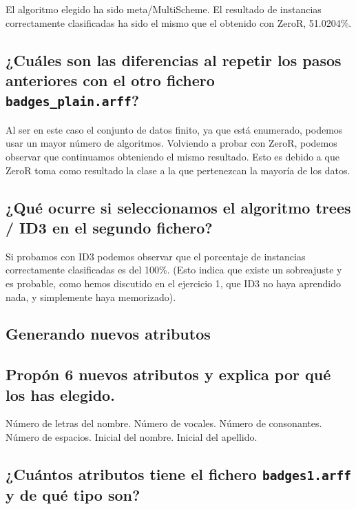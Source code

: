 \documentclass[12pt]{article}
\begin{document}
El algoritmo elegido ha sido meta/MultiScheme. El resultado de instancias correctamente clasificadas ha sido el mismo que el obtenido con ZeroR, 51.0204\%.

\subsection{\small ¿Cuáles son las diferencias al repetir los pasos anteriores con el otro
fichero \texttt{badges\_plain.arff}?}

Al ser en este caso el conjunto de datos finito, ya que está enumerado, podemos usar un mayor número de algoritmos. Volviendo a probar con ZeroR, podemos observar que continuamos obteniendo el mismo resultado. Esto es debido a que ZeroR toma como resultado la clase a la que pertenezcan la mayoría de los datos.

\subsection{\small ¿Qué ocurre si seleccionamos el algoritmo trees / ID3 en el segundo
fichero?}

Si probamos con ID3 podemos observar que el porcentaje de instancias correctamente clasificadas es del 100\%. (Esto indica que existe un sobreajuste y es probable, como hemos discutido en el ejercicio 1, que ID3 no haya aprendido nada, y simplemente haya memorizado).

\newpage

\begin{center}
\section{Generando nuevos atributos}
\end{center}

\subsection{\small Propón 6 nuevos atributos y explica por qué los has elegido.}

Número de letras del nombre. Número de vocales. Número de consonantes. Número de espacios. Inicial del nombre. Inicial del apellido.

\subsection{\small ¿Cuántos atributos tiene el fichero \texttt{badges1.arff} y de qué tipo
son?}
\end{document}
